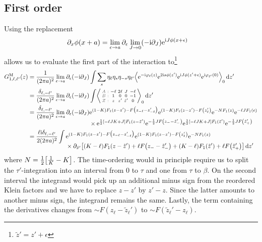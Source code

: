 \documentclass[english, parskip=full]{scrartcl}
\begin{document}
\subsection{First order}
Using the replacement
\begin{align}
\partial_x\phi(x+a) &= \lim_{\epsilon\rightarrow a} \partial_\epsilon \lim_{J\rightarrow 0} (-\text{i}\partial_J) \text{e}^{\text{i} J\phi(x+\epsilon)}
\end{align}
allows us to evaluate the first part of the interaction to\footnote{$\tilde{z}' = z' + \epsilon$}
\begin{align}
G_{1,\ell,\ell'}^\M(z) &= \frac{1}{(2\pi a)^2} \lim_{\epsilon\rightarrow a} \partial_\epsilon (-\i\partial_J) \int \sum_s \eta_\ell \eta_s \eta_{-s} \eta_{\ell'} \bra*{\powe{-\i\varphi_\ell(z)} \powe{2\i s\phi(z')} \powe{\i J\phi(z'+\epsilon)} \powe{\i\varphi_{\ell'}(0)}}_0\,\d z'\\
&= \frac{\delta_{\ell,-\ell'}}{(2\pi a)^2} \lim_{\epsilon\rightarrow a} \partial_\epsilon (-\i\partial_J) \int \bra*{\zabx{-\ell & 2\ell & J & -\ell}{1 & 0 & 0 & -1}{z & z' & \tilde{z}' & 0}}_0\,\d z'\\
&= \frac{\delta_{\ell,-\ell'}}{(2\pi a)^2} \lim_{\epsilon\rightarrow a} \partial_\epsilon (-\i\partial_J) \bsplit{&\powe{(1-K) F_1(z-z') -F\kla[\big]{z_{-\ell} - z_{-\ell}'}} \powe{(1-K) F_1(z-z')-F\kla*{z_{\ell}'}} \powe{-NF_1(z)} \powe{-\ell JF_1(\epsilon)}\\
&\times \powe{\frac{1}{2}\klb*{-\ell JK + J}F_1(z-\tilde{z}')} \powe{-\frac{1}{2}J F\kla*{z_{-} - \tilde{z}_{-}'}} \powe{\frac{1}{2}\klb*{-\ell JK + J}F_1(\tilde{z}')} \powe{-\frac{1}{2}J F\kla*{\tilde{z}_{+}'}}}\\
&= \frac{\ell\i \delta_{\ell,-\ell'}}{2(2\pi a)^2} \int \bsplit{&\powe{(1-K) F_1(z-z') -F\kla[\big]{z_{-\ell} - z_{-\ell}'}} \powe{(1-K) F_1(z-z')-F\kla*{z_{\ell}'}} \powe{-NF_1(z)}\\
&\times \partial_{\tilde{x}'} \klb*{\kla*{ K-\ell}F_1(z-\tilde{z}')+\ell F\kla*{z_{-} - \tilde{z}_{-}'}+\kla*{ K -\ell}F_1(\tilde{z}')+\ell F\kla*{\tilde{z}_{+}'}}\,\d z'}
\end{align}
where $N=\frac{1}{2} \klb*{\frac{1}{K} - K}$.
The time-ordering would in principle require us to split the $\tau'$-integration into an interval from $0$ to $\tau$ and one from $\tau$ to $\beta$.
On the second interval the integrand would pick up an additional minus sign from the reordered Klein factors and we have to replace $z-z'$ by $z'-z$.
Since the latter amounts to another minus sign, the integrand remains the same.
Lastly, the term containing the derivatives changes from $\sim F(z_\ell - \tilde{z}_\ell')$ to $\sim F(\tilde{z}_\ell' - z_\ell)$.
\end{document}
